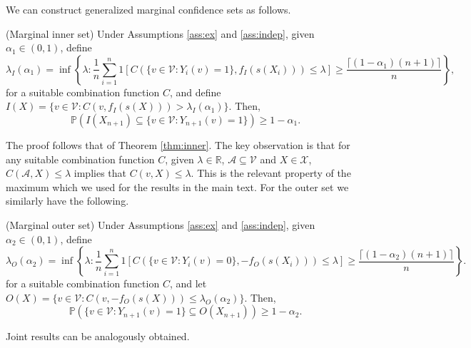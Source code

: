We can construct generalized marginal confidence sets as follows.
\begin{theorem}\label{thm:innergen}
	(Marginal inner set)
	Under Assumptions \ref{ass:ex} and \ref{ass:indep}, given $\alpha_1 \in (0,1)$, define 
	\begin{equation*}
		\lambda_I(\alpha_1) = \inf\left\lbrace \lambda: \frac{1}{n} \sum_{i = 1}^n 1\left[ C(\lbrace v \in \mathcal{V}: Y_i(v) = 1\rbrace, f_I(s(X_i))) \leq \lambda \right] \geq \frac{\lceil (1-\alpha_1)(n+1) \rceil}{n} \right\rbrace,
	\end{equation*}
 	for a suitable combination function $C$, and define $I(X) = \lbrace v \in \mathcal{V}: C(v, f_I(s(X))) >\lambda_I(\alpha_1)  \rbrace $. Then,
	\begin{equation}\label{eq:probstat}
		\mathbb{P}\left( I(X_{n+1}) \subseteq\lbrace v\in \mathcal{V}: Y_{n+1}(v) = 1 \rbrace \right) \geq 1 - \alpha_1.
	\end{equation}
\end{theorem}
The proof follows that of Theorem \ref{thm:inner}. The key observation is that for any suitable combination function $C$,  given $\lambda \in \mathbb{R}$, $\mathcal{A} \subseteq \mathcal{V} $ and $X \in \mathcal{X}$, $C(\mathcal{A}, X) \leq \lambda$ implies that $C(v, X) \leq \lambda$. This is the relevant property of the maximum which we used for the results in the main text. For the outer set we similarly have the following.
\begin{theorem}\label{thm:genouter}
	(Marginal outer set)
	Under Assumptions \ref{ass:ex} and \ref{ass:indep}, given $\alpha_2 \in (0,1)$, define 
	\begin{equation*}
		\lambda_O({\alpha_2})= \inf\left\lbrace \lambda: \frac{1}{n} \sum_{i = 1}^n 1\left[ C(\lbrace v \in \mathcal{V}: Y_i(v) = 0\rbrace, -f_O(s(X_i))) \leq \lambda \right] \geq \frac{\lceil (1-\alpha_2)(n+1) \rceil}{n} \right\rbrace.
	\end{equation*}
	for a suitable combination function $C$, and let $O(X) = \lbrace v \in \mathcal{V}: C(v, -f_O(s(X))) \leq \lambda_O(\alpha_2)  \rbrace $. Then,
	\begin{equation}\label{eq:probstat}
		\mathbb{P}\left( \lbrace v\in \mathcal{V}: Y_{n+1}(v) = 1 \rbrace \subseteq O(X_{n+1}) \right) \geq 1 - \alpha_2.
	\end{equation}
\end{theorem}
Joint results can be analogously obtained. 

